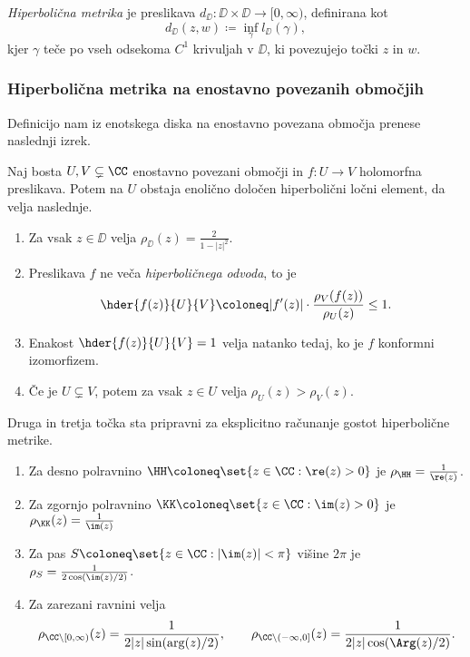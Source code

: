 \begin{definicija}
    \emph{Hiperbolična metrika} je preslikava \(d_{\DD} \colon \DD \times \DD \to [0, \infty)\), definirana kot
    \[d_{\DD} (z, w) \coloneq \inf_{\gamma} l_{\DD} (\gamma),\]
    kjer \(\gamma\) teče po vseh odsekoma \(C^1\) krivuljah v \(\DD\), ki povezujejo točki \(z\) in \(w\).
\end{definicija}

\subsubsection{Hiperbolična metrika na enostavno povezanih območjih}

Definicijo nam iz enotskega diska na enostavno povezana območja prenese naslednji izrek.

\begin{izrek}[Pick] \label{thm:pick}
    Naj bosta \(U, V \subsetneq \CC\) enostavno povezani območji in \(f \colon U \to V\) holomorfna preslikava. Potem na \(U\) obstaja enolično določen hiperbolični ločni element, da velja naslednje.
    \begin{enumerate}
        \item Za vsak \(z \in \DD\) velja \(\rho_{\DD} (z) = \frac{2}{1 - |z|^2}\).
        \item Preslikava \(f\) ne veča \emph{hiperboličnega odvoda}, to je \[\hder{f (z)}{U}{V} \coloneq |f' (z)| \cdot \frac{\rho_V (f (z))}{\rho_U (z)} \leq 1.\]
        \item Enakost \(\hder{f (z)}{U}{V} = 1\) velja natanko tedaj, ko je \(f\) konformni izomorfizem.
        \item Če je \(U \subsetneq V\), potem za vsak \(z \in U\) velja \(\rho_U (z) > \rho_V (z)\). 
    \end{enumerate}
\end{izrek}

\noindent Druga in tretja točka sta pripravni za eksplicitno računanje gostot hiperbolične metrike.

\begin{trditev} \label{prop:hypexamples} \mbox{}
    \begin{enumerate}
        \item Za desno polravnino \(\HH \coloneq \set{ z \in \CC : \re (z) > 0 }\) je \(\rho_\HH = \frac{1}{\re (z)}\).
        \item Za zgornjo polravnino \(\KK \coloneq \set{z \in \CC : \im (z) > 0}\) je \(\rho_{\KK} (z) = \frac{1}{\im (z)}\)
        \item Za pas \(S \coloneq \set{z \in \CC : |\im (z)| < \pi}\) višine \(2 \pi\) je \(\rho_{S} = \frac{1}{2 \cos (\im (z) / 2)}\).
        \item Za zarezani ravnini velja
            \[
                \rho_{\CC \setminus [0, \infty)} (z) = \frac{1}{2 |z| \sin (\arg (z) / 2)},
                \qquad
                \rho_{\CC \setminus (-\infty, 0]} (z) = \frac{1}{2 |z| \cos (\Arg (z) / 2)}.
            \]
    \end{enumerate}
\end{trditev}

